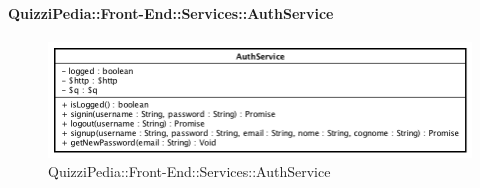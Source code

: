 \paragraph{QuizziPedia::Front-End::Services::AuthService}
\begin{figure}[ht]
	\centering
	\includegraphics[scale=0.80]{UML/Classi/Front-End/QuizziPedia_Front-end_Services_AuthService.png}
	\caption{QuizziPedia::Front-End::Services::AuthService}
\end{figure} \FloatBarrier
